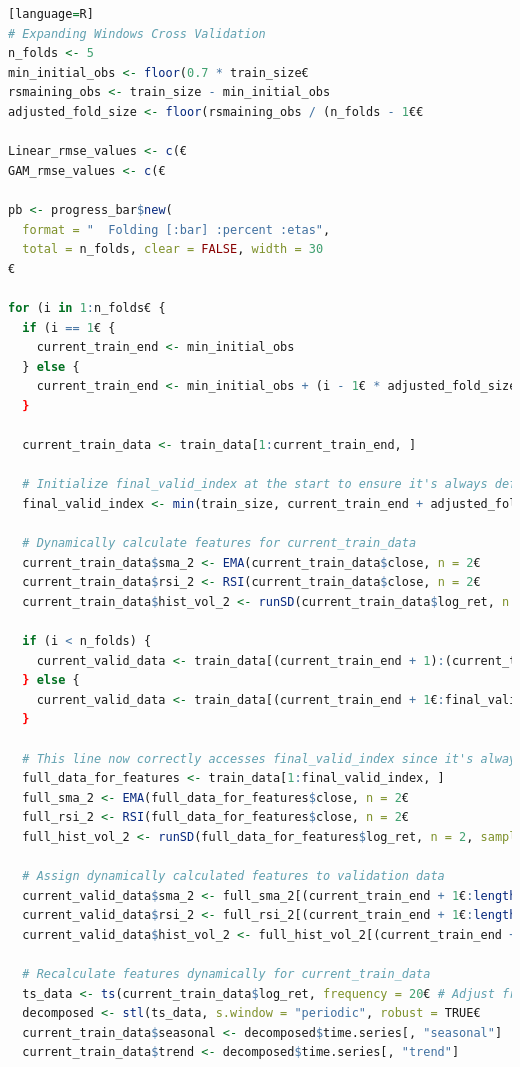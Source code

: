 \documentclass[12pt, twoside,hidelinks]{article}
\theoremstyle{definition}
\numberwithin{equation}{section}
\begin{document}
\begin{lstlisting}[language=R][language=R]
# Expanding Windows Cross Validation
n_folds <- 5
min_initial_obs <- floor(0.7 * train_size€
rsmaining_obs <- train_size - min_initial_obs
adjusted_fold_size <- floor(rsmaining_obs / (n_folds - 1€€

Linear_rmse_values <- c(€
GAM_rmse_values <- c(€

pb <- progress_bar$new(
  format = "  Folding [:bar] :percent :etas",
  total = n_folds, clear = FALSE, width = 30
€

for (i in 1:n_folds€ {
  if (i == 1€ {
    current_train_end <- min_initial_obs
  } else {
    current_train_end <- min_initial_obs + (i - 1€ * adjusted_fold_size
  }
  
  current_train_data <- train_data[1:current_train_end, ]
  
  # Initialize final_valid_index at the start to ensure it's always defined
  final_valid_index <- min(train_size, current_train_end + adjusted_fold_size€
  
  # Dynamically calculate features for current_train_data
  current_train_data$sma_2 <- EMA(current_train_data$close, n = 2€
  current_train_data$rsi_2 <- RSI(current_train_data$close, n = 2€
  current_train_data$hist_vol_2 <- runSD(current_train_data$log_ret, n = 2, sample = FALSE€
  
  if (i < n_folds) {
    current_valid_data <- train_data[(current_train_end + 1):(current_train_end + adjusted_fold_size€, ]
  } else {
    current_valid_data <- train_data[(current_train_end + 1€:final_valid_index, ]
  }
  
  # This line now correctly accesses final_valid_index since it's always defined
  full_data_for_features <- train_data[1:final_valid_index, ]
  full_sma_2 <- EMA(full_data_for_features$close, n = 2€
  full_rsi_2 <- RSI(full_data_for_features$close, n = 2€
  full_hist_vol_2 <- runSD(full_data_for_features$log_ret, n = 2, sample = FALSE€
  
  # Assign dynamically calculated features to validation data
  current_valid_data$sma_2 <- full_sma_2[(current_train_end + 1€:length(full_sma_2€]
  current_valid_data$rsi_2 <- full_rsi_2[(current_train_end + 1€:length(full_rsi_2€]
  current_valid_data$hist_vol_2 <- full_hist_vol_2[(current_train_end + 1€:length(full_hist_vol_2€]
  
  # Recalculate features dynamically for current_train_data
  ts_data <- ts(current_train_data$log_ret, frequency = 20€ # Adjust frequency as needed
  decomposed <- stl(ts_data, s.window = "periodic", robust = TRUE€
  current_train_data$seasonal <- decomposed$time.series[, "seasonal"]
  current_train_data$trend <- decomposed$time.series[, "trend"]
  

\end{lstlisting}
\end{document}
